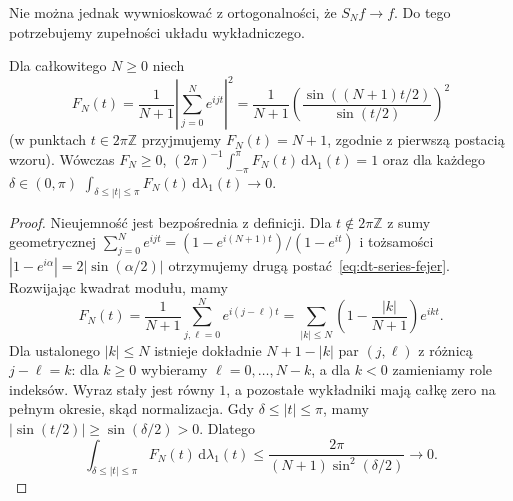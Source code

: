 Nie można jednak wywnioskować z ortogonalności, że $S_Nf\to f$.
Do tego potrzebujemy zupełności układu wykładniczego.

\begin{lemat}
\label{lem:dt-series-fejer}
Dla całkowitego $N\geq0$ niech
\begin{equation}\label{eq:dt-series-fejer}
 F_N(t)=\frac1{N+1}\left|\sum_{j=0}^Ne^{ijt}\right|^2
 =\frac1{N+1}\left(\frac{\sin((N+1)t/2)}{\sin(t/2)}\right)^2
\end{equation}
(w punktach $t\in2\pi\mathbb Z$ przyjmujemy
$F_N(t)=N+1$, zgodnie z pierwszą postacią wzoru). Wówczas $F_N\ge0$,
$(2\pi)^{-1}\int_{-\pi}^{\pi}F_N(t)\,\mathrm d\lambda_1(t)=1$ oraz
dla każdego $\delta\in(0,\pi)$
$\int_{\delta\le|t|\le\pi}F_N(t)\,\mathrm d\lambda_1(t)\to0$.
\end{lemat}
\begin{proof}
Nieujemność jest bezpośrednia z definicji.
Dla $t\notin2\pi\mathbb Z$ z sumy geometrycznej
$\sum_{j=0}^N e^{ijt}=(1-e^{i(N+1)t})/(1-e^{it})$
i tożsamości $|1-e^{i\alpha}|=2|\sin(\alpha/2)|$
otrzymujemy drugą postać~\eqref{eq:dt-series-fejer}.
Rozwijając kwadrat modułu, mamy
\[
 F_N(t)=\frac1{N+1}\sum_{j,\ell=0}^N e^{i(j-\ell)t}
 =\sum_{|k|\leq N}\left(1-\frac{|k|}{N+1}\right)e^{ikt}.
\]
Dla ustalonego $|k|\leq N$ istnieje dokładnie
$N+1-|k|$ par $(j,\ell)$ z różnicą $j-\ell=k$:
dla $k\geq0$ wybieramy $\ell=0,\ldots,N-k$,
a dla $k<0$ zamieniamy role indeksów.
Wyraz stały jest równy $1$, a pozostałe
wykładniki mają całkę zero na pełnym okresie,
skąd normalizacja. Gdy $\delta\leq|t|\leq\pi$,
mamy $|\sin(t/2)|\geq\sin(\delta/2)>0$.
Dlatego
\[
 \int_{\delta\leq|t|\leq\pi}F_N(t)\,\mathrm d\lambda_1(t)
 \leq\frac{2\pi}{(N+1)\sin^2(\delta/2)}
 \longrightarrow0.
\]
\end{proof}

